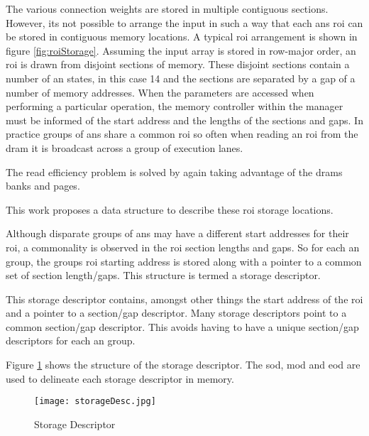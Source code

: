 The various connection weights are stored in multiple contiguous sections. However, its not possible to arrange the input in such a way that each \acp{an} \ac{roi} can be stored in contiguous memory locations. 
A typical \ac{roi} arrangement is shown in figure \ref{fig:roiStorage}. Assuming the input array is stored in row-major order, an \ac{roi} is drawn from disjoint sections of memory. 
These disjoint sections contain a number of \ac{an} states, in this case 14 and the sections are separated by a gap of a number of memory addresses. 
When the parameters are accessed when performing a particular operation, the memory controller within the manager must be informed of the start address and the lengths of the sections and gaps. 
In practice groups of \acp{an} share a common \ac{roi} so often when reading an \ac{roi} from the \ac{dram} it is broadcast across a group of execution lanes.

The read efficiency problem is solved by again taking advantage of the \ac{dram}s banks and pages.

This work proposes a data structure to describe these \ac{roi} storage locations.

Although disparate groups of \acp{an} may have a different start addresses for their \ac{roi}, a commonality is observed in the \ac{roi} section lengths and gaps. So for each \ac{an} group, the groups \ac{roi} starting address is stored along with a pointer to a common set of section length/gaps. This structure is termed a storage descriptor.

This storage descriptor contains, amongst other things the start address of the \ac{roi} and a pointer to a section/gap descriptor. Many storage descriptors point to a common section/gap descriptor. This avoids having to have a unique section/gap descriptors for each \ac{an} group.

Figure \ref{fig:storageDescriptor} shows the structure of the storage descriptor. The \ac{sod}, \ac{mod} and \ac{eod} are used to delineate each storage descriptor in memory.

\begin{figure}[!t]
\centering
\captionsetup{justification=centering}
\captionsetup{width=.9\linewidth}
\centerline{
\mbox{\texttt{[image: storageDesc.jpg]}}
}
\caption{Storage Descriptor}
\label{fig:storageDescriptor}
\end{figure}

